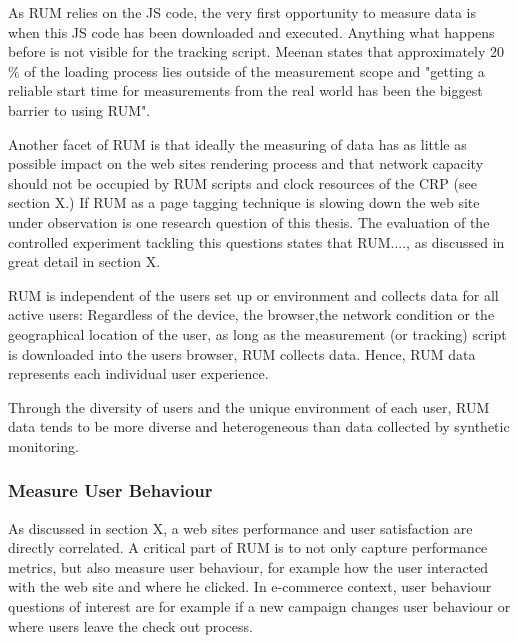 As RUM relies on the JS code, the very first opportunity to measure data is when this JS code has been downloaded and executed.
Anything what happens before is not visible for the tracking script.
Meenan states that approximately 20 \% of the loading process lies outside of the measurement scope and "getting a reliable start time for measurements from the real world has been the biggest barrier to using RUM".%

Another facet of RUM is that ideally the measuring of data has as little as possible impact on the web sites rendering process and that network capacity should not be occupied by RUM scripts and clock resources of the CRP (see section X.) %
If RUM as a page tagging technique is slowing down the web site under observation is one research question of this thesis.
The evaluation of the controlled experiment tackling this questions states that RUM...., as discussed in great detail in section X. %



RUM is independent of the users set up or environment and collects data for all active users:
Regardless of the device, the browser,the network condition or the geographical location of the user, as long as the measurement (or tracking) script is downloaded into the users browser, RUM collects data.%
Hence, RUM data represents each individual user experience. %

Through the diversity of users and the unique environment of each user,  RUM data tends to be more diverse and heterogeneous than data collected by synthetic monitoring. %



\subsubsection{Measure User Behaviour}


As discussed in section X, a web sites performance and user satisfaction are directly correlated.
A critical part of RUM is to not only capture performance metrics, but also measure user behaviour, for example how the user interacted with the web site and where he clicked. %
In e-commerce context, user behaviour questions of interest are for example if a new campaign changes user behaviour or where users leave the check out process. %

